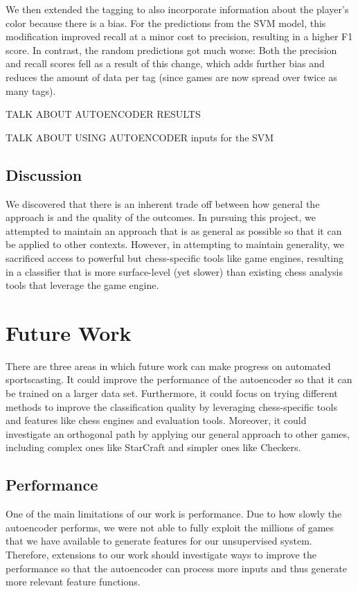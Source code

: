 \documentclass[11pt]{article}
\begin{document}
We then extended the tagging to also incorporate information about the player’s color because there is a bias. For the predictions from the SVM model, this modification improved recall at a minor cost to precision, resulting in a higher F1 score. In contrast, the random predictions got much worse: Both the precision and recall scores fell as a result of this change, which adds further bias and reduces the amount of data per tag (since games are now spread over twice as many tags).

TALK ABOUT AUTOENCODER RESULTS

TALK ABOUT USING AUTOENCODER inputs for the SVM

\subsection{Discussion}
We discovered that there is an inherent trade off between how general the approach is and the quality of the outcomes. In pursuing this project, we attempted to maintain an approach that is as general as possible so that it can be applied to other contexts. However, in attempting to maintain generality, we sacrificed access to powerful but chess-specific tools like game engines, resulting in a classifier that is more surface-level (yet slower) than existing chess analysis tools that leverage the game engine. 

\section{Future Work}
There are three areas in which future work can make progress on automated sportscasting. It could improve the performance of the autoencoder so that it can be trained on a larger data set. Furthermore, it could focus on trying different methods to improve the classification quality by leveraging chess-specific tools and features like chess engines and evaluation tools. Moreover, it could investigate an orthogonal path by applying our general approach to other games, including complex ones like StarCraft and simpler ones like Checkers.

\subsection{Performance}
One of the main limitations of our work is performance. Due to how slowly the autoencoder performs, we were not able to fully exploit the millions of games that we have available to generate features for our unsupervised system. Therefore, extensions to our work should investigate ways to improve the performance so that the autoencoder can process more inputs and thus generate more relevant feature functions.
\end{document}

